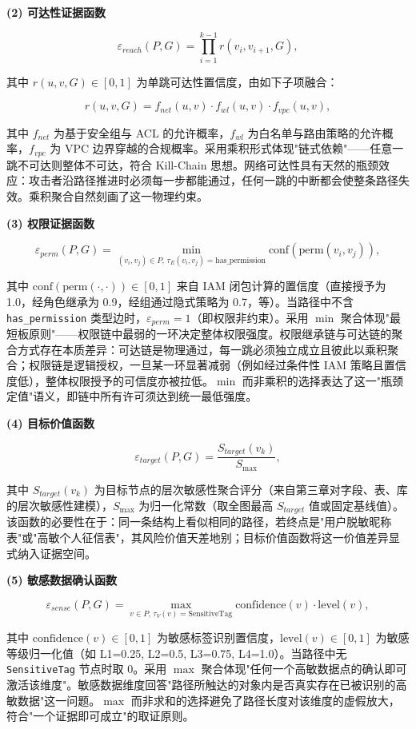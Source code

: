 \documentclass[a4paper,12pt]{ctexart}
\begin{document}
\textbf{(2) 可达性证据函数}

\[
\varepsilon_{reach}(P, G) = \prod_{i=1}^{k-1} r(v_i, v_{i+1}, G),
\]

其中 $r(u, v, G) \in [0,1]$ 为单跳可达性置信度，由如下子项融合：

\[
r(u, v, G) = f_{net}(u, v) \cdot f_{wl}(u, v) \cdot f_{vpc}(u, v),
\]

其中 $f_{net}$ 为基于安全组与 ACL 的允许概率，$f_{wl}$ 为白名单与路由策略的允许概率，$f_{vpc}$ 为 VPC 边界穿越的合规概率。采用乘积形式体现"链式依赖"——任意一跳不可达则整体不可达，符合 Kill-Chain 思想。网络可达性具有天然的瓶颈效应：攻击者沿路径推进时必须每一步都能通过，任何一跳的中断都会使整条路径失效。乘积聚合自然刻画了这一物理约束。

\textbf{(3) 权限证据函数}

\[
\varepsilon_{perm}(P, G) = \min_{(v_i, v_j) \in P, \, \tau_E(v_i,v_j)=\text{has\_permission}} \text{conf}(\text{perm}(v_i, v_j)),
\]

其中 $\text{conf}(\text{perm}(\cdot,\cdot)) \in [0,1]$ 来自 IAM 闭包计算的置信度（直接授予为 1.0，经角色继承为 0.9，经组通过隐式策略为 0.7，等）。当路径中不含 \texttt{has\_permission} 类型边时，$\varepsilon_{perm} = 1$（即权限非约束）。采用 $\min$ 聚合体现"最短板原则"——权限链中最弱的一环决定整体权限强度。权限继承链与可达链的聚合方式存在本质差异：可达链是物理通过，每一跳必须独立成立且彼此以乘积聚合；权限链是逻辑授权，一旦某一环显著减弱（例如经过条件性 IAM 策略且置信度低），整体权限授予的可信度亦被拉低。$\min$ 而非乘积的选择表达了这一"瓶颈定值"语义，即链中所有许可须达到统一最低强度。

\textbf{(4) 目标价值函数}

\[
\varepsilon_{target}(P, G) = \frac{S_{target}(v_k)}{S_{\max}},
\]

其中 $S_{target}(v_k)$ 为目标节点的层次敏感性聚合评分（来自第三章对字段、表、库的层次敏感性建模），$S_{\max}$ 为归一化常数（取全图最高 $S_{target}$ 值或固定基线值）。该函数的必要性在于：同一条结构上看似相同的路径，若终点是"用户脱敏昵称表"或"高敏个人征信表"，其风险价值天差地别；目标价值函数将这一价值差异显式纳入证据空间。

\textbf{(5) 敏感数据确认函数}

\[
\varepsilon_{sense}(P, G) = \max_{v \in P, \, \tau_V(v)=\text{SensitiveTag}} \text{confidence}(v) \cdot \text{level}(v),
\]

其中 $\text{confidence}(v) \in [0,1]$ 为敏感标签识别置信度，$\text{level}(v) \in [0,1]$ 为敏感等级归一化值（如 L1=0.25, L2=0.5, L3=0.75, L4=1.0）。当路径中无 \texttt{SensitiveTag} 节点时取 0。采用 $\max$ 聚合体现"任何一个高敏数据点的确认即可激活该维度"。敏感数据维度回答"路径所触达的对象内是否真实存在已被识别的高敏数据"这一问题。$\max$ 而非求和的选择避免了路径长度对该维度的虚假放大，符合"一个证据即可成立"的取证原则。
\end{document}
